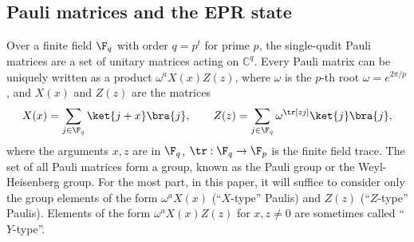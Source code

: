 \documentclass[11pt]{article}
\begin{document}
\subsection{Pauli matrices and the EPR state}
\label{sec:paulis}
Over a finite field $\F_q$ with order $q = p^t$ for prime $p$, the single-qudit Pauli matrices are a set
of unitary matrices acting on $\mathbb{C}^q$. Every Pauli matrix can
be uniquely written as a product $\omega^{a} X(x) Z(z)$, where $\omega$ is the $p$-th root
$\omega = e^{2\pi/p}$, and $X(x)$ and $Z(z)$ are the matrices
\begin{equation}
  X(x) = \sum_{j \in \F_q} \ket{j+x}\bra{j}, \qquad Z(z) =
  \sum_{j \in \F_q} \omega^{\tr[z j]}\ket{j}
  \bra{j}, \label{eq:pauli-definition} \end{equation}
where the arguments $x, z$ are in $\F_q$, $\tr: \F_q \to \F_p$ is the finite field
trace. The set of all Pauli matrices form a group, known as the Pauli
group or the Weyl-Heisenberg group. For the most part,
in this paper, it will suffice to consider only the group elements of
the form
$\omega^a X(x)$ (``$X$-type'' Paulis) and $Z(z)$ (``$Z$-type''
Paulis). Elements of the form $\omega^a X(x)Z(z)$ for $x, z \neq 0$
are sometimes called ``$Y$-type''.
\end{document}

